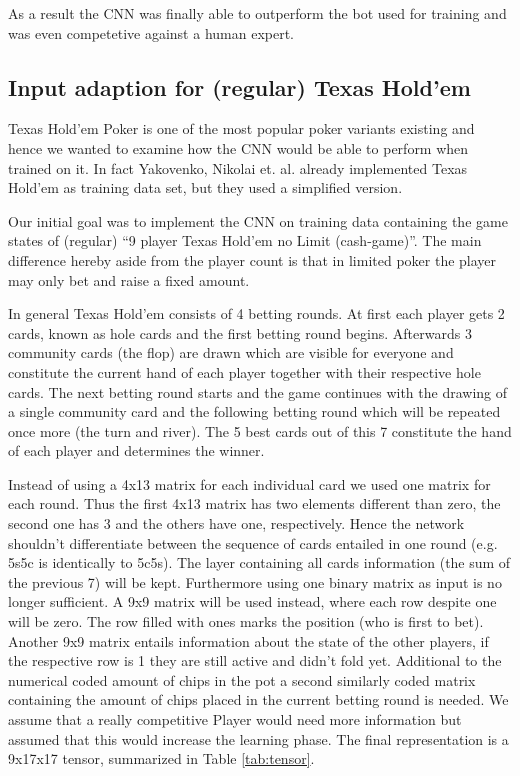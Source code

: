 \documentclass[]{report}
\begin{document}
As a result the CNN was finally able to outperform the bot used for
training and was even competetive against a human expert.

\subsection{Input adaption for (regular) Texas Hold'em \label{see:adapted_p} }

Texas Hold'em Poker is one of the most popular poker variants existing
and hence we wanted to examine how the CNN would be able to perform
when trained on it. In fact Yakovenko, Nikolai et. al. already implemented
Texas Hold'em as training data set, but they used a simplified version.

Our initial goal was to implement the CNN on training data containing
the game states of (regular) ``9 player Texas Hold'em no Limit (cash-game)''.
The main difference hereby aside from the player count is that in
limited poker the player may only bet and raise a fixed amount.

In general Texas Hold'em consists of 4 betting rounds. At first each
player gets 2 cards, known as hole cards and the first betting round
begins. Afterwards 3 community cards (the flop) are drawn which are
visible for everyone and constitute the current hand of each player
together with their respective hole cards. The next betting round
starts and the game continues with the drawing of a single community
card and the following betting round which will be repeated once more
(the turn and river). The 5 best cards out of this 7 constitute
the hand of each player and determines the winner.

Instead of using a 4x13 matrix for each individual card we used one
matrix for each round. Thus the first 4x13 matrix has two elements
different than zero, the second one has 3 and the others have one,
respectively. Hence the network shouldn't differentiate between the
sequence of cards entailed in one round (e.g. 5s5c is identically
to 5c5s). The layer containing all cards information (the sum of the
previous 7) will be kept. Furthermore using one binary matrix as input
is no longer sufficient. A 9x9 matrix will be used instead, where
each row despite one will be zero. The row filled with ones marks
the position (who is first to bet). Another 9x9 matrix entails information
about the state of the other players, if the respective row is 1 they
are still active and didn't fold yet. Additional to the numerical
coded amount of chips in the pot a second similarly coded matrix containing
the amount of chips placed in the current betting round is needed.
We assume that a really competitive Player would need more information
but assumed that this would increase the learning phase. The final
representation is a 9x17x17 tensor, summarized in Table \ref{tab:tensor}.
\end{document}
